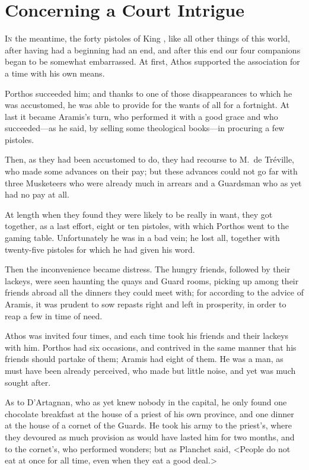 
\chapter{Concerning a Court Intrigue}

\lettrine{I}{n} the meantime, the forty pistoles of King , like all other things of this world, after having had a beginning had an end, and after this end our four companions began to be somewhat embarrassed. At first, Athos supported the association for a time with his own means. 

Porthos succeeded him; and thanks to one of those disappearances to which he was accustomed, he was able to provide for the wants of all for a fortnight. At last it became Aramis's turn, who performed it with a good grace and who succeeded—as he said, by selling some theological books—in procuring a few pistoles. 

Then, as they had been accustomed to do, they had recourse to M.~de Tréville, who made some advances on their pay; but these advances could not go far with three Musketeers who were already much in arrears and a Guardsman who as yet had no pay at all. 

At length when they found they were likely to be really in want, they got together, as a last effort, eight or ten pistoles, with which Porthos went to the gaming table. Unfortunately he was in a bad vein; he lost all, together with twenty-five pistoles for which he had given his word. 

Then the inconvenience became distress. The hungry friends, followed by their lackeys, were seen haunting the quays and Guard rooms, picking up among their friends abroad all the dinners they could meet with; for according to the advice of Aramis, it was prudent to sow repasts right and left in prosperity, in order to reap a few in time of need. 

Athos was invited four times, and each time took his friends and their lackeys with him. Porthos had six occasions, and contrived in the same manner that his friends should partake of them; Aramis had eight of them. He was a man, as must have been already perceived, who made but little noise, and yet was much sought after. 

As to D'Artagnan, who as yet knew nobody in the capital, he only found one chocolate breakfast at the house of a priest of his own province, and one dinner at the house of a cornet of the Guards. He took his army to the priest's, where they devoured as much provision as would have lasted him for two months, and to the cornet's, who performed wonders; but as Planchet said, <People do not eat at once for all time, even when they eat a good deal.> 

